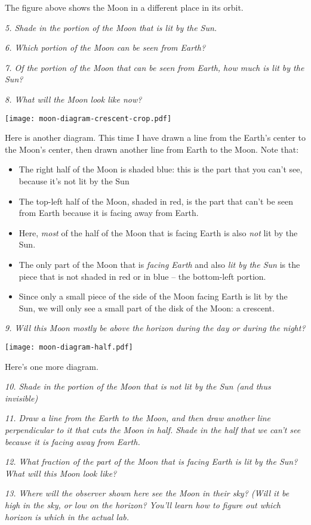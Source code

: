 \documentclass[11pt]{article}
\begin{document}
The figure above shows the Moon in a different place in its orbit.

{\it 5. Shade in the portion of the Moon that is lit by the Sun.}

{\it 6. Which portion of the Moon can be seen from Earth? }

\vspace{0.9in}

{\it 7. Of the portion of the Moon that can be seen from Earth, how much is lit by the Sun?}

\vspace{0.9in}

{\it 8. What will the Moon look like now?}

\vspace{1.8in}

\newpage

\texttt{[image: moon-diagram-crescent-crop.pdf]}

Here is another diagram. This time I have drawn a line from the Earth's center to the Moon's center, then drawn another line from Earth to the Moon. Note that:

\begin{itemize}
	\item The right half of the Moon is shaded blue: this is the part that you can't see, because it's not lit by the Sun
	\item The top-left half of the Moon, shaded in red, is the part that can't be seen from Earth because it is facing away from Earth.
	\item Here, {\it most} of the half of the Moon that is facing Earth is also {\it not} lit by the Sun.
	\item The only part of the Moon that is {\it facing Earth} and also {\it lit by the Sun} is the piece that is not shaded in red or in blue -- the bottom-left portion.
	\item Since only a small piece of the side of the Moon facing Earth is lit by the Sun, we will only see a small part of the disk of the Moon: a crescent.
\end{itemize}

{\it 9. Will this Moon mostly be above the horizon during the day or during the night?}

\newpage
\texttt{[image: moon-diagram-half.pdf]}

Here's one more diagram. 

{\it 10. Shade in the portion of the Moon that is not lit by the Sun (and thus invisible)}

{\it 11. Draw a line from the Earth to the Moon, and then draw another line perpendicular to it that cuts the Moon in half. Shade in the half that we can't see because it is facing away from Earth.}

{\it 12. What fraction of the part of the Moon that is facing Earth is lit by the Sun? What will this Moon look like?}

\vspace{1.5in}

{\it 13. Where will the observer shown here see the Moon in their sky? (Will it be high in the sky, or low on the horizon? You'll learn how to figure out which horizon is which in the actual lab.}
\end{document}
